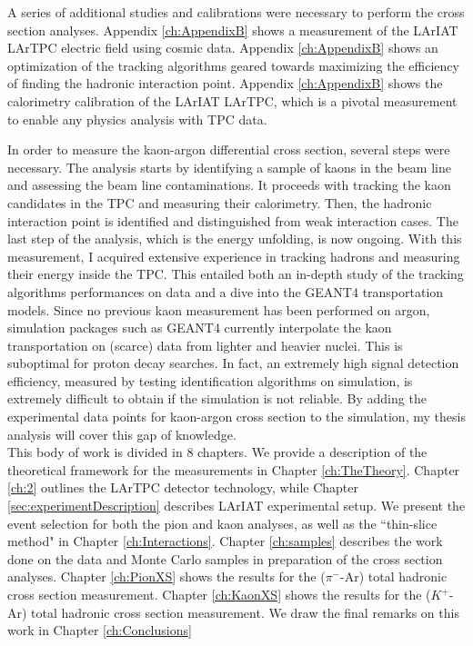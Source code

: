 A series of additional studies and calibrations were necessary to perform the cross section analyses. Appendix \ref{ch:AppendixB} shows a measurement of the LArIAT LArTPC electric field using cosmic data. Appendix \ref{ch:AppendixB} shows an optimization of the tracking algorithms geared towards maximizing the efficiency of finding the hadronic interaction point. Appendix \ref{ch:AppendixB} shows the calorimetry calibration of the LArIAT LArTPC, which is a pivotal measurement to enable any physics analysis with TPC data.  











In order to measure the kaon-argon differential cross section, several steps were necessary. The analysis starts by identifying a sample of kaons in the beam line and assessing the beam line contaminations. It proceeds with tracking the kaon candidates in the TPC and measuring their calorimetry.  Then,  the hadronic interaction point is identified and distinguished from weak interaction cases. The last step of the analysis, which is the energy unfolding, is now ongoing. 
With  this measurement, I acquired extensive experience in tracking hadrons and measuring their energy inside the TPC. This entailed both an in-depth study of the tracking algorithms performances on data and a dive into the GEANT4 transportation models. Since no previous kaon measurement has been performed on argon, simulation packages such as GEANT4 currently interpolate the kaon transportation on (scarce) data from lighter and heavier nuclei. This is suboptimal for proton decay searches.  In fact, an extremely high signal detection efficiency, measured by testing identification algorithms on simulation, is extremely difficult to obtain if the simulation is not reliable. By adding the experimental data points for kaon-argon cross section to the simulation, my thesis analysis will cover this gap of knowledge.\\


This body of work is divided in 8 chapters.
We provide a description of the theoretical framework for the measurements in  Chapter \ref{ch:TheTheory}. Chapter \ref{ch:2} outlines the LArTPC detector technology, while
Chapter \ref{sec:experimentDescription} describes LArIAT experimental setup. We present the event selection for both the pion and kaon analyses, as well as the ``thin-slice method" in Chapter \ref{ch:Interactions}.  Chapter \ref{ch:samples}  describes the work done on the data and Monte Carlo samples in preparation of the cross section analyses.
Chapter \ref{ch:PionXS} shows  the results for the ($\pi^-$-Ar) total hadronic cross section measurement. Chapter \ref{ch:KaonXS} shows  the results for the ($K^+$-Ar) total hadronic cross section measurement. We draw the final remarks on this work in Chapter \ref{ch:Conclusions}

